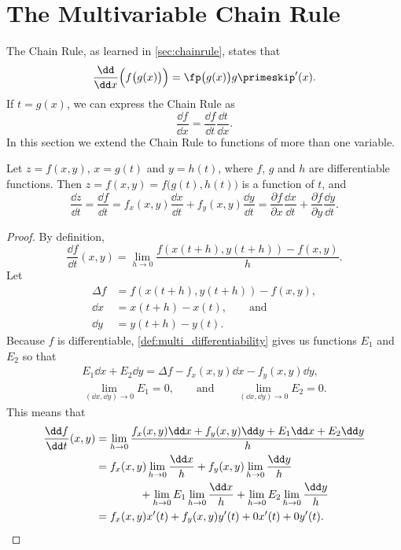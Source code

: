 \section{The Multivariable Chain Rule}\label{sec:multi_chain}

The Chain Rule, as learned in \autoref{sec:chainrule}, states that
\[\dfrac{\dd}{\dd x}\Bigl(f\bigl(g(x)\bigr)\Bigr) = \fp\bigl(g(x)\bigr)g\primeskip'(x).\]
If $t=g(x)$, we can express the Chain Rule as 
\[\frac{\dd f}{\dd x} = \frac{\dd f}{\dd t}\frac{\dd t}{\dd x}.\]
In this section we extend the Chain Rule to functions of more than one variable.

\begin{theorem}\label{thm:multi_chain}
Let $z=f(x,y)$, $x=g(t)$ and $y=h(t)$, where $f$, $g$ and $h$ are differentiable functions. Then $z = f(x,y) = f\bigl(g(t),h(t)\bigr)$ is a function of $t$, and 
\[
	\frac{\dd z}{\dd t} = \frac{\dd f}{\dd t}
	= f_x(x,y)\frac{\dd x}{\dd t}+f_y(x,y)\frac{\dd y}{\dd t}
	= \frac{\partial f}{\partial x}\frac{\dd x}{\dd t}
	+\frac{\partial f}{\partial y}\frac{\dd y}{\dd t}.
\]
\end{theorem}

\begin{proof}
By definition,
\[\frac{\dd f}{\dd t}(x,y)=\lim_{h\to0}\frac{f(x(t+h),y(t+h))-f(x,y)}h.\]
Let
\begin{align*}
 \Delta f&=f(x(t+h),y(t+h))-f(x,y), \\
 \dd x&=x(t+h)-x(t),\qquad\text{and} \\
 \dd y&=y(t+h)-y(t).
\end{align*}
Because $f$ is differentiable, \autoref{def:multi_differentiability} gives us functions $E_1$ and $E_2$ so that
\begin{gather*}
 E_1\dd x+E_2\dd y = \Delta f-f_x(x,y)\dd x-f_y(x,y)\dd y,\\
 \lim_{(\dd x,\dd y)\to0}E_1=0,\qquad\text{and}\qquad
 \lim_{(\dd x,\dd y)\to0}E_2=0.
\end{gather*}
This means that
\begin{align*}
 \frac{\dd f}{\dd t}(x,y)
 &=\lim_{h\to0}\frac{f_x(x,y)\dd x+f_y(x,y)\dd y+E_1\dd x+E_2\dd y}h \\
 &=f_x(x,y)\lim_{h\to0}\frac{\dd x}h+f_y(x,y)\lim_{h\to0}\frac{\dd y}h \\
 &\qquad\qquad{}
 +\lim_{h\to0}E_1\lim_{h\to0}\frac{\dd x}h+\lim_{h\to0}E_2\lim_{h\to0}\frac{\dd y}h \\
 &=f_x(x,y)x'(t)+f_y(x,y)y'(t)+0x'(t)+0y'(t).\qedhere
\end{align*}
\end{proof}

